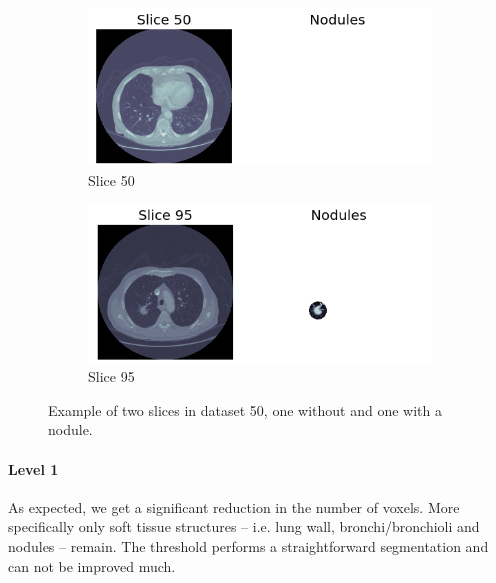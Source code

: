 \begin{figure}[ht]
\begin{center}
	\begin{subfigure}[b]{\linewidth}
		\includegraphics[width=\linewidth]{img/cascades/D50S50.png}
		\caption{Slice 50}
	\end{subfigure}
	\begin{subfigure}[b]{\linewidth}
		\includegraphics[width=\linewidth]{img/cascades/D50S95.png}
  		\caption{Slice 95}
	\end{subfigure}
	\caption{Example of two slices in dataset 50, one without and one with a
	nodule.}
	\label{fig:d50}
\end{center}
\end{figure}

\paragraph{Level 1}
As expected, we get a significant reduction in the number of voxels. More
specifically only soft tissue structures -- i.e. lung wall, bronchi/bronchioli
and nodules -- remain. The threshold performs a straightforward segmentation and
can not be improved much.

